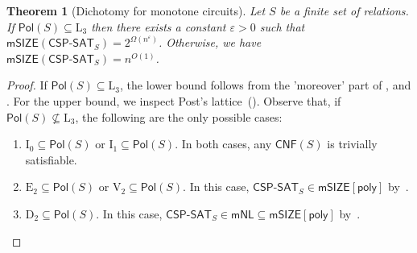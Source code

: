 \documentclass[10pt,a4paper]{article}
\newtheorem{theorem}{Theorem}[section]
\newcommand{\eps}{\varepsilon}
\newcommand{\poly}{\mathsf{poly}}
\newcommand{\complexityfont}[1]{\mathsf{#1}}
\newcommand{\monclass}[1]{\mathsf{m}#1}
\newcommand\NL           {\complexityfont{NL}}
\def\mNL          {\monclass{\NL}}
\def\SIZE         {\complexityfont{SIZE}}
\def\mSIZE        {\monclass{\SIZE}}
\newcommand{\CNF}{\mathsf{CNF}}
\newcommand{\Cmon}[1]{\mathsf{mSIZE}({#1})}
\def\sseq{\subseteq}
\newcommand{\CSPf}[1]{\mathsf{CSP}\text{-}\mathsf{SAT}_{#1}}
\newcommand{\Pol}{\mathsf{Pol}}
\newcommand{\clonefont}[1]{\mathrm{#1}}
\begin{document}
\begin{theorem}[Dichotomy for monotone circuits]
    \label{thm:monckt-dichotomy}
    Let $S$ be a finite set of relations.
    If 
    $\Pol(S) \sseq \clonefont{L_3}$
    then there exists a constant $\eps > 0$
    such that
    $\Cmon{\CSPf{S}} = 2^{\Omega(n^\eps)}$.
    Otherwise, 
    we have
    $\Cmon{\CSPf{S}} = n^{O(1)}$.
\end{theorem}
\begin{proof}
    If $\Pol(S) \sseq \clonefont{L_3}$, the lower bound follows from
    the 'moreover' part of 
    , and 
    .
    For the upper bound, we inspect Post's
    lattice~().
    Observe that, if $\Pol(S) \not\sseq \clonefont{L_3}$, the following are the only possible cases:
    \begin{enumerate}
        \item $\clonefont{I_0} \sseq \Pol(S)$ or $\clonefont{I_1} \sseq \Pol(S)$.
            In both cases, any $\CNF(S)$ is trivially satisfiable.
        \item $\clonefont{E_2} \sseq \Pol(S)$ or $\clonefont{V_2} \sseq \Pol(S)$.
            In this case, $\CSPf{S} \in \mSIZE[\poly]$ 
            by~.
        \item $\clonefont{D_2} \sseq \Pol(S)$.
            In this case, $\CSPf{S} \in \mNL \sseq \mSIZE[\poly]$ 
            by~.
            \qedhere
    \end{enumerate}
\end{proof}
\end{document}
